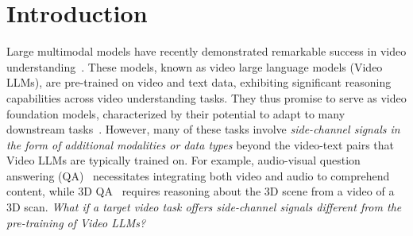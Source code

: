 \section{Introduction}
\label{sec:intro}


Large multimodal models have recently demonstrated remarkable success in video understanding~\cite{li2024llava, Qwen2VL, gpt4}. These models, known as video large language models (Video LLMs), are pre-trained on video and text data, exhibiting significant reasoning capabilities across video understanding tasks. They thus promise to serve as video foundation models, characterized by their potential to adapt to many downstream tasks~\cite{bommasani2021opportunities}. However, many of these tasks involve \textit{side-channel signals in the form of additional modalities or data types} beyond the video-text pairs that Video LLMs are typically trained on. For example, audio-visual question answering (QA)~\cite{alamri2019audiovisualsceneawaredialog} necessitates integrating both video and audio to comprehend content, while 3D QA~\cite{azuma_2022_CVPR} requires reasoning about the 3D scene from a video of a 3D scan. 
\textit{What if a target video task offers side-channel signals different from the pre-training of Video LLMs?}  


